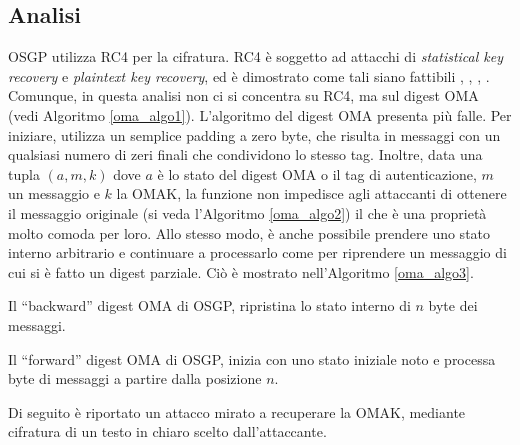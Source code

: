 \subsection{Analisi}
OSGP utilizza RC4 per la cifratura. RC4 è soggetto ad attacchi di \textit{statistical key recovery} e \textit{plaintext key recovery}, ed è dimostrato come tali siano fattibili \cite{rc4tls}, \cite{weakrc4}, \cite{rc4rand}, \cite{rc4statistical}. Comunque, in questa analisi non ci si concentra su RC4, ma sul digest OMA (vedi Algoritmo \ref{oma_algo1}). L'algoritmo del digest OMA presenta più falle. Per iniziare, utilizza un semplice padding a zero byte, che risulta in messaggi con un qualsiasi numero di zeri finali che condividono lo stesso tag. Inoltre, data una tupla $(a, m, k)$ dove $a$ è lo stato del digest OMA o il tag di autenticazione, $m$ un messaggio e $k$ la OMAK, la funzione non impedisce agli attaccanti di ottenere il messaggio originale (si veda l'Algoritmo \ref{oma_algo2}) il che è una proprietà molto comoda per loro. Allo stesso modo, è anche possibile prendere uno stato interno arbitrario e continuare a processarlo come per riprendere un messaggio di cui si è fatto un digest parziale. Ciò è mostrato nell'Algoritmo \ref{oma_algo3}.
\begin{algorithm}[!h]
	\caption{Il ``backward'' digest OMA di OSGP, ripristina lo stato interno di $n$ byte dei messaggi.}
	\label{oma_algo2}
\end{algorithm}
\newpage
\begin{algorithm}[!h]
	\caption{Il ``forward'' digest OMA di OSGP, inizia con uno stato iniziale noto e processa byte di messaggi a partire dalla posizione $n$.}
	\label{oma_algo3}
\end{algorithm} 
Di seguito è riportato un attacco mirato a recuperare la OMAK, mediante cifratura di un testo in chiaro scelto dall'attaccante.
